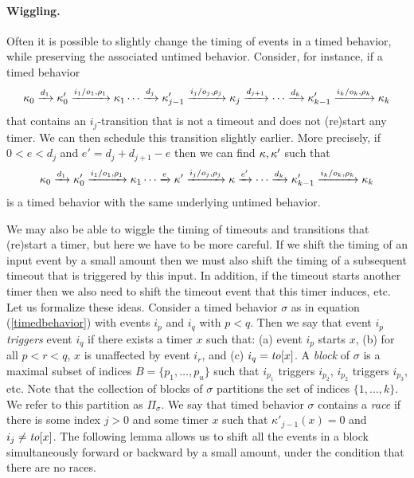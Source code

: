 \paragraph{Wiggling.}
Often it is possible to slightly change the timing of events in a timed behavior, 
while preserving the associated untimed behavior.
Consider, for instance, if a timed behavior 
\[
\kappa_0 \xrightarrow{d_1} \kappa'_0 \xrightarrow{i_1/o_1, \rho_1} \kappa_1 \cdots
\xrightarrow{d_j} \kappa'_{j-1} \xrightarrow{i_j/o_j, \rho_j} \kappa_j  \xrightarrow{d_{j+1}} \cdots
\xrightarrow{d_k} \kappa'_{k-1} \xrightarrow{i_k/o_k, \rho_k} \kappa_{k}
\]
that contains an $i_j$-transition that is not a timeout and does not (re)start any timer.
We can then schedule this transition slightly earlier.
More precisely, if $0 < e < d_j$ and $e' = d_j + d_{j+1}- e $ then we can find $\kappa, \kappa'$ such that
\[
\kappa_0 \xrightarrow{d_1} \kappa'_0 \xrightarrow{i_1/o_1, \rho_1} \kappa_1 \cdots
\xrightarrow{e} \kappa' \xrightarrow{i_j/o_j, \rho_j} \kappa  \xrightarrow{e'} \cdots
\xrightarrow{d_k} \kappa'_{k-1} \xrightarrow{i_k/o_k, \rho_k} \kappa_{k}
\]
is a timed behavior with the same underlying untimed behavior.

We may also be able to wiggle the timing of timeouts and transitions that (re)start a timer,
but here we have to be more careful.
If we shift the timing of an input event by a small amount then we must also shift the timing of a subsequent timeout
that is triggered by this input.
In addition, if the timeout starts another timer then we also need to shift the timeout event that this timer induces, etc.
%
Let us formalize these ideas. Consider a timed behavior $\sigma$ as in equation (\ref{timedbehavior})
with events $i_p$ and $i_q$ with $p < q$.
Then we say that event $i_p$ \emph{triggers} event $i_q$ if there exists a timer $x$ such that:
(a) event $i_p$ starts $x$, 
(b) for all $p < r < q$, $x$ is unaffected by event $i_r$, and
(c) $i_q = \mathit{to}[x]$.
A \emph{block} of $\sigma$ is a maximal subset of indices $B = \{ p_1 ,\ldots, p_u \}$ such that $i_{p_1}$ triggers $i_{p_2}$, $i_{p_2}$ triggers $i_{p_3}$, etc.
Note that the collection of blocks of $\sigma$ partitions the set of indices $\{ 1 ,\ldots, k \}$.
We refer to this partition as $\Pi_{\sigma}$.
We say that timed behavior $\sigma$ contains a \emph{race} if there is some index $j>0$ and some timer $x$  
such that $\kappa'_{j-1}(x) = 0$ and $i_j \neq \mathit{to}[x]$.
The following lemma allows us to shift all the events in a block simultaneously forward or backward by a small amount, 
under the condition that there are no races.


